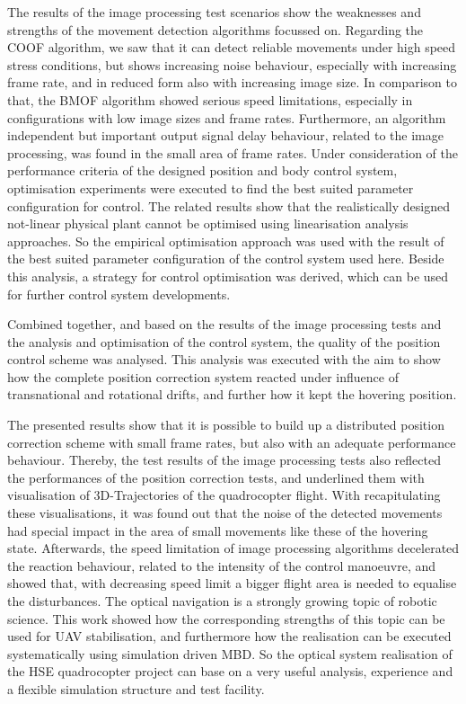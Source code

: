The results of the image processing test scenarios show the weaknesses and strengths of the movement detection algorithms focussed on. Regarding the \gls{COOF} algorithm, we saw that it can detect reliable movements under high speed stress conditions, but shows increasing noise behaviour, especially with increasing frame rate, and in reduced form also with increasing image size. In comparison to that, the \gls{BMOF} algorithm showed serious speed limitations, especially in configurations with low image sizes and frame rates. Furthermore, an algorithm independent but important output signal delay behaviour, related to the image processing, was found in the small area of frame rates.
\newpage
Under consideration of the performance criteria of the designed position and body control system, optimisation experiments were executed to find the best suited parameter configuration for control. The related results show that the realistically designed not-linear physical plant cannot be optimised using linearisation analysis approaches. So the empirical optimisation approach was used with the result of the best suited parameter configuration of the control system used here. Beside this analysis, a strategy for control optimisation was derived, which can be used for further control system developments.

Combined together, and based on the results of the image processing tests and the analysis and optimisation of the control system, the quality of the position control scheme was analysed. This analysis was executed with the aim to show how the complete position correction system reacted under influence of transnational and rotational drifts, and further how it kept the hovering position.

The presented results show that it is possible to build up a distributed position correction scheme with small frame rates, but also with an adequate performance behaviour. Thereby, the test results of the image processing tests also reflected the performances of the position correction tests, and underlined them with visualisation of 3D-Trajectories of the quadrocopter flight. With recapitulating these visualisations, it was found out that the noise of the detected movements had special impact in the area of small movements like these of the hovering state. Afterwards, the speed limitation of image processing algorithms decelerated the reaction behaviour, related to the intensity of the control manoeuvre, and showed that, with decreasing speed limit a bigger flight area is needed to equalise the disturbances.
\newpage
The optical navigation is a strongly growing topic of robotic science. This work showed how the corresponding strengths of this topic can be used for \gls{UAV} stabilisation, and furthermore how the realisation can be executed systematically using simulation driven \gls{MBD}. So the optical system realisation of the \gls{HSE} quadrocopter project can base on a very useful analysis, experience and a flexible simulation structure and test facility.


